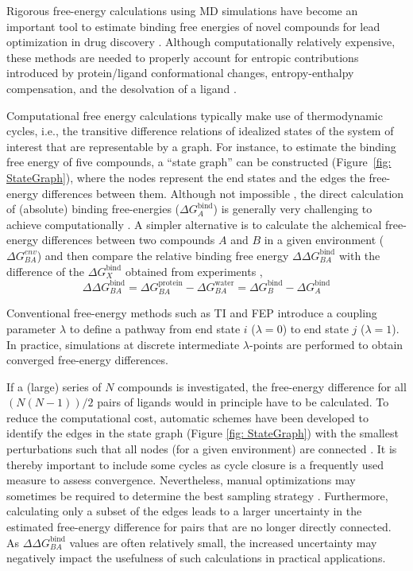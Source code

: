 Rigorous free-energy calculations using MD simulations have become an important tool to estimate binding free energies of novel compounds for lead optimization in drug discovery \cite{Cournia2017, Armacost2020,Cournia2020}. Although computationally relatively expensive, these methods are needed to properly account for entropic contributions introduced by protein/ligand conformational changes, entropy-enthalpy compensation, and the desolvation of a ligand \cite{Chodera2013}.

Computational free energy calculations typically make use of thermodynamic cycles, i.e., the transitive difference relations of idealized states of the system of interest that are representable by a graph. For instance, to estimate the binding free energy of five compounds, a ``state graph'' can be constructed (Figure~\ref{fig: StateGraph}), where the nodes represent the end states and the edges the free-energy differences between them. Although not impossible \cite{Aldeghi2016}, the direct calculation of (absolute) binding free-energies ($\Delta G^\text{bind}_A$) is generally very challenging to achieve computationally \cite{Cournia2017}. A simpler alternative is to calculate the alchemical free-energy differences between two compounds $A$ and $B$ in a given environment ($\Delta G_{BA}^{env}$) and then compare the relative binding free energy $\Delta \Delta G^\text{bind}_{BA}$ with the difference of the $\Delta G^\text{bind}_X$ obtained from experiments \cite{Jorgensen1988b, Merz1991},
\begin{equation}
    \Delta \Delta G^\text{bind}_{BA} = \Delta G_{BA}^{\text{protein}} - \Delta G_{BA}^{\text{water}}
    = \Delta G^\text{bind}_B - \Delta G^\text{bind}_A
\end{equation}

Conventional free-energy methods such as TI \cite{Kirkwood1935} and FEP \cite{Zwanzig1954} introduce a coupling parameter $\lambda$ to define a pathway from end state $i$ ($\lambda=0$) to end state $j$ ($\lambda=1$). In practice, simulations at discrete intermediate $\lambda$-points are performed to obtain converged free-energy differences.

%
If a (large) series of $N$ compounds is investigated, the free-energy difference for all $(N(N-1))/2$ pairs of ligands would in principle have to be calculated. To reduce the computational cost, automatic schemes have been developed to identify the edges in the state graph (Figure \ref{fig: StateGraph}) with the smallest perturbations such that all nodes (for a given environment) are connected \cite{Liu2013,Wang2015,Yang2020}. It is thereby important to include some cycles as cycle closure is a frequently used measure to assess convergence. 
Nevertheless, manual optimizations may sometimes be required to determine the best sampling strategy \cite{Jespers2019}.
Furthermore, calculating only a subset of the edges leads to a larger uncertainty in the estimated free-energy difference for pairs that are no longer directly connected. As $\Delta \Delta G^\text{bind}_{BA}$ values are often relatively small, the increased uncertainty may negatively impact the usefulness of such calculations in practical applications. 

